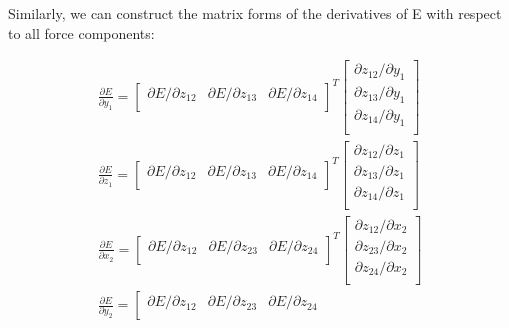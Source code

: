 \documentclass{article}
\begin{document}
\noindent Similarly, we can construct the matrix forms of the derivatives of E with respect to 
all force components:

\begin{eqnarray}
\frac{\partial{E}}{\partial{y_1}} = \left[\begin{array}{ccc}
	\partial{E} / \partial{z_{12}} &
	\partial{E} / \partial{z_{13}} &
	\partial{E} / \partial{z_{14}} \\
\end{array}
\right]^T
\left[\begin{array}{c}
	\partial{z_{12}} / \partial{y_{1}} \\
	\partial{z_{13}} / \partial{y_{1}} \\
	\partial{z_{14}} / \partial{y_{1}} \\
\end{array}
\right] \\ %
\frac{\partial{E}}{\partial{z_1}} = \left[\begin{array}{ccc}
	\partial{E} / \partial{z_{12}} &
	\partial{E} / \partial{z_{13}} &
	\partial{E} / \partial{z_{14}} \\
\end{array}
\right]^T
\left[\begin{array}{c}
	\partial{z_{12}} / \partial{z_{1}} \\
	\partial{z_{13}} / \partial{z_{1}} \\
	\partial{z_{14}} / \partial{z_{1}} \\
\end{array}
\right] \\ %
\frac{\partial{E}}{\partial{x_2}} = \left[\begin{array}{ccc}
	\partial{E} / \partial{z_{12}} &
	\partial{E} / \partial{z_{23}} &
	\partial{E} / \partial{z_{24}} \\
\end{array}
\right]^T
\left[\begin{array}{c}
	\partial{z_{12}} / \partial{x_{2}} \\
	\partial{z_{23}} / \partial{x_{2}} \\
	\partial{z_{24}} / \partial{x_{2}} \\
\end{array}
\right] \\ %
\frac{\partial{E}}{\partial{y_2}} = \left[\begin{array}{ccc}
	\partial{E} / \partial{z_{12}} &
	\partial{E} / \partial{z_{23}} &
	\partial{E} / \partial{z_{24}} \\

\end{array}
\end{eqnarray}
\end{document}
